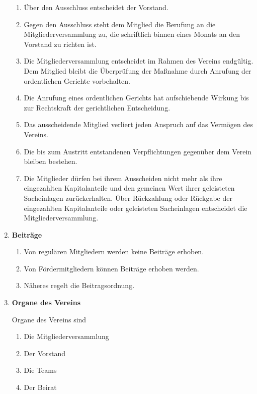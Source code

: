 \documentclass[german]{article}
\newcommand{\paragr}[1]{\item \textsf{\textbf{#1}}}
\begin{document}
\begin{enumerate}
\begin{enumerate}
\item Über den Ausschluss entscheidet der Vorstand.

\item Gegen den Ausschluss steht dem Mitglied die Berufung an die Mitgliederversammlung zu, die schriftlich binnen eines Monats an den Vorstand zu richten ist.

\item Die Mitgliederversammlung entscheidet im Rahmen des Vereins endgültig.
Dem Mitglied bleibt die Überprüfung der Maßnahme durch Anrufung der ordentlichen Gerichte vorbehalten.

\item Die Anrufung eines ordentlichen Gerichts hat aufschiebende Wirkung bis zur Rechtskraft der gerichtlichen Entscheidung.

\item Das ausscheidende Mitglied verliert jeden Anspruch auf das Vermögen des Vereins.

\item Die bis zum Austritt entstandenen Verpflichtungen gegenüber dem Verein bleiben bestehen.

\item Die Mitglieder dürfen bei ihrem Ausscheiden nicht mehr als ihre eingezahlten Kapitalanteile und den gemeinen Wert ihrer geleisteten Sacheinlagen zurückerhalten.
Über Rückzahlung oder Rückgabe der eingezahlten Kapitalanteile oder geleisteten Sacheinlagen  entscheidet die Mitgliederversammlung.

\end{enumerate}


\paragr{Beiträge}
\begin{enumerate}

\item Von regulären Mitgliedern werden keine Beiträge erhoben.

\item Von Fördermitgliedern können Beiträge erhoben werden.

\item Näheres regelt die Beitragsordnung.

\end{enumerate}


\paragr{Organe des Vereins}

Organe des Vereins sind
\begin{enumerate}
\item Die Mitgliederversammlung
\item Der Vorstand
\item Die Teams
\item Der Beirat
\end{enumerate}



\end{enumerate}
\end{document}
